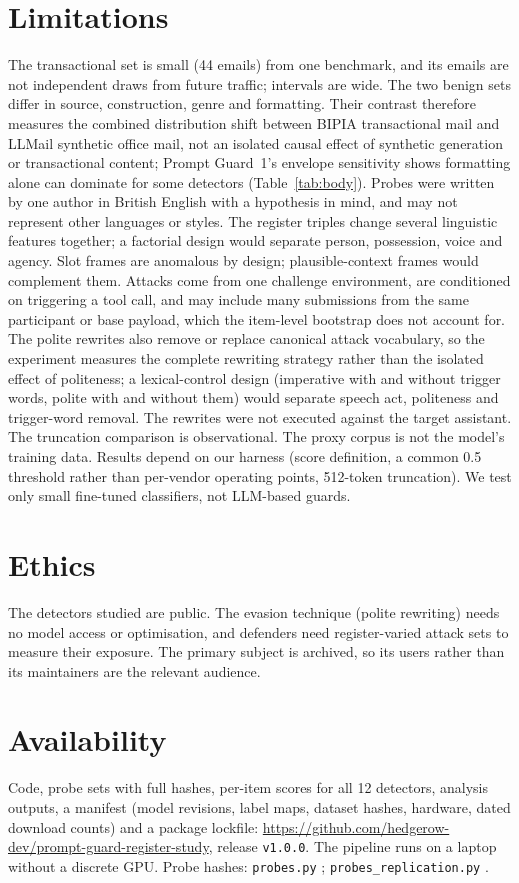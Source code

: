 \documentclass[11pt]{article}
\begin{document}
\section{Limitations}
The transactional set is small (44 emails) from one benchmark, and its emails are not independent draws from future traffic; intervals are wide. The two benign sets differ in source, construction, genre and formatting. Their contrast therefore measures the combined distribution shift between BIPIA transactional mail and LLMail synthetic office mail, not an isolated causal effect of synthetic generation or transactional content; Prompt Guard~1's envelope sensitivity shows formatting alone can dominate for some detectors (Table~\ref{tab:body}). Probes were written by one author in British English with a hypothesis in mind, and may not represent other languages or styles. The register triples change several linguistic features together; a factorial design would separate person, possession, voice and agency. Slot frames are anomalous by design; plausible-context frames would complement them. Attacks come from one challenge environment, are conditioned on triggering a tool call, and may include many submissions from the same participant or base payload, which the item-level bootstrap does not account for. The polite rewrites also remove or replace canonical attack vocabulary, so the experiment measures the complete rewriting strategy rather than the isolated effect of politeness; a lexical-control design (imperative with and without trigger words, polite with and without them) would separate speech act, politeness and trigger-word removal. The rewrites were not executed against the target assistant. The truncation comparison is observational. The proxy corpus is not the model's training data. Results depend on our harness (score definition, a common 0.5 threshold rather than per-vendor operating points, 512-token truncation). We test only small fine-tuned classifiers, not LLM-based guards.

\section{Ethics}
The detectors studied are public. The evasion technique (polite rewriting) needs no model access or optimisation, and defenders need register-varied attack sets to measure their exposure. The primary subject is archived, so its users rather than its maintainers are the relevant audience.

\section{Availability}\label{sec:availability}
Code, probe sets with full hashes, per-item scores for all 12 detectors, analysis outputs, a manifest (model revisions, label maps, dataset hashes, hardware, dated download counts) and a package lockfile: \url{https://github.com/hedgerow-dev/prompt-guard-register-study}, release \texttt{v1.0.0}. The pipeline runs on a laptop without a discrete GPU. Probe hashes: \texttt{probes.py} ; \texttt{probes\_replication.py} .
\end{document}
